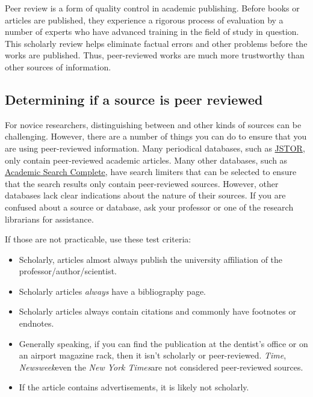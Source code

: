 Peer review is a form of quality control in academic publishing. Before books
or articles are published, they experience a rigorous process of evaluation by
a number of experts who have advanced training in the field of study in
question. This scholarly review helps eliminate factual errors and other
problems before the works are published. Thus, peer-reviewed works are much more
trustworthy than other sources of information.

\subsection{Determining if a source is peer reviewed}

For novice researchers, distinguishing between \hyperlink{peer-review}{\color{Ahrenge}{peer-reviewed}} and other kinds of sources can be challenging. However, there are a number of things you can do to
ensure that you are using  peer-reviewed information. Many periodical databases,
such as  \href{http://dartmouth.idm.oclc.org/login?url=http://www.jstor.org/}{JSTOR}, only contain
peer-reviewed academic articles. Many other databases, such as
\href{http://dartmouth.idm.oclc.org/login?url=http://search.ebscohost.com/login.aspx?authtype=ip,uid&profile=ehost&defaultdb=a9h}{Academic
Search Complete}, have search limiters that can be selected to ensure  that the
search results only contain peer-reviewed sources. However, other  databases
lack clear indications about the nature of their sources. If you are  confused
about a source or database, ask your professor or one of the research
librarians for assistance.

If those are not practicable, use these test criteria: 

\begin{itemize} 

\item Scholarly, \hyperlink{peer-review}{\color{Ahrenge}{peer-reviewed}} articles almost always publish the university
affiliation of the professor/author/scientist.

\item Scholarly articles \emph{always} have a bibliography page.

\item Scholarly articles always contain citations and commonly have footnotes
or endnotes.

\item Generally speaking, if you can find the publication at the dentist's
office or on an airport magazine rack, then it isn't scholarly or
peer-reviewed. \emph{Time}, \emph{Newsweek}\textemdash even the \emph{New York
Times}\textemdash are not considered peer-reviewed sources. 

\item If the article contains advertisements, it is likely not scholarly. 

\end{itemize}

